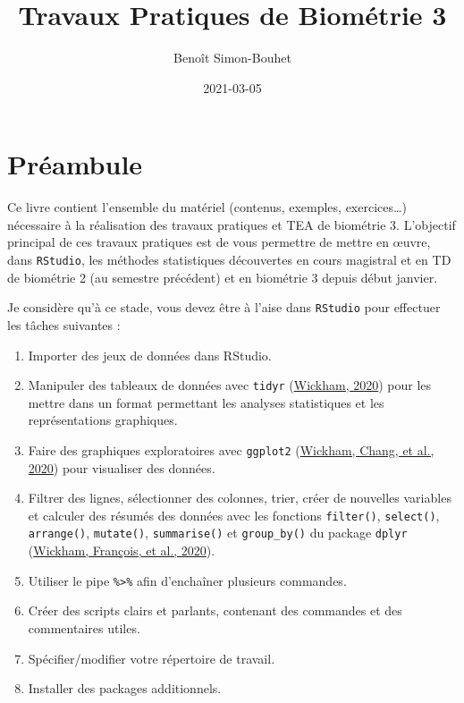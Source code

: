 \documentclass[
  a4paper,
]{article}
\title{Travaux Pratiques de Biométrie 3}
\author{Benoît Simon-Bouhet}
\date{2021-03-05}
\providecommand{\tightlist}{%
  \setlength{\itemsep}{0pt}\setlength{\parskip}{0pt}}
\begin{document}
\maketitle

{
\hypersetup{linkcolor=}
\setcounter{tocdepth}{2}
\tableofcontents
}
\hypertarget{pruxe9ambule}{%
\section{Préambule}\label{pruxe9ambule}}

Ce livre contient l'ensemble du matériel (contenus, exemples, exercices\ldots) nécessaire à la réalisation des travaux pratiques et TEA de biométrie 3. L'objectif principal de ces travaux pratiques est de vous permettre de mettre en œuvre, dans \texttt{RStudio}, les méthodes statistiques découvertes en cours magistral et en TD de biométrie 2 (au semestre précédent) et en biométrie 3 depuis début janvier.

Je considère qu'à ce stade, vous devez être à l'aise dans \texttt{RStudio} pour effectuer les tâches suivantes :

\begin{enumerate}
\def\labelenumi{\arabic{enumi}.}
\tightlist
\item
  Importer des jeux de données dans RStudio.
\item
  Manipuler des tableaux de données avec \texttt{tidyr} (\protect\hyperlink{ref-R-tidyr}{Wickham, 2020}) pour les mettre dans un format permettant les analyses statistiques et les représentations graphiques.
\item
  Faire des graphiques exploratoires avec \texttt{ggplot2} (\protect\hyperlink{ref-R-ggplot2}{Wickham, Chang, et al., 2020}) pour visualiser des données.
\item
  Filtrer des lignes, sélectionner des colonnes, trier, créer de nouvelles variables et calculer des résumés des données avec les fonctions \texttt{filter()}, \texttt{select()}, \texttt{arrange()}, \texttt{mutate()}, \texttt{summarise()} et \texttt{group\_by()} du package \texttt{dplyr} (\protect\hyperlink{ref-R-dplyr}{Wickham, François, et al., 2020}).
\item
  Utiliser le pipe \texttt{\%\textgreater{}\%} afin d'enchaîner plusieurs commandes.
\item
  Créer des scripts clairs et parlants, contenant des commandes et des commentaires utiles.
\item
  Spécifier/modifier votre répertoire de travail.
\item
  Installer des packages additionnels.
\end{enumerate}
\end{document}
